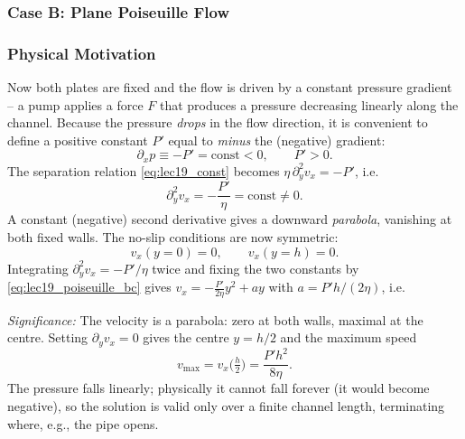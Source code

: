 \documentclass[../main.tex]{subfiles}
\begin{document}
\subsubsection{Case B: Plane Poiseuille Flow}\label{sec:lec19:poiseuille}

\subsubsection*{Physical Motivation}
Now both plates are fixed and the flow is driven by a constant pressure gradient -- a pump applies a force $F$ that produces a pressure decreasing linearly along the channel. Because the pressure \emph{drops} in the flow direction, it is convenient to define a positive constant $P'$ equal to \emph{minus} the (negative) gradient:
\begin{equation}
  \partial_x p \equiv -P' = \text{const}<0,\qquad P'>0 .
  \label{eq:lec19_Pdef}
\end{equation}
The separation relation \eqref{eq:lec19_const} becomes $\eta\,\partial_y^2 v_x=-P'$, i.e.
\begin{equation}
  \partial_y^2 v_x = -\frac{P'}{\eta}=\text{const}\neq0 .
  \label{eq:lec19_poiseuille_eq}
\end{equation}
A constant (negative) second derivative gives a downward \emph{parabola}, vanishing at both fixed walls. The no-slip conditions are now symmetric:
\begin{equation}
  v_x(y{=}0)=0,\qquad v_x(y{=}h)=0 .
  \label{eq:lec19_poiseuille_bc}
\end{equation}
Integrating $\partial_y^2 v_x=-P'/\eta$ twice and fixing the two constants by \eqref{eq:lec19_poiseuille_bc} gives $v_x=-\tfrac{P'}{2\eta}y^2+ay$ with $a=P'h/(2\eta)$, i.e.

\textit{Significance:} The velocity is a parabola: zero at both walls, maximal at the centre. Setting $\partial_y v_x=0$ gives the centre $y=h/2$ and the maximum speed
\begin{equation}
  v_{\max}=v_x\!\Big(\tfrac{h}{2}\Big)=\frac{P'h^2}{8\eta}.
  \label{eq:lec19_vmax}
\end{equation}
The pressure falls linearly; physically it cannot fall forever (it would become negative), so the solution is valid only over a finite channel length, terminating where, e.g., the pipe opens.
\end{document}

